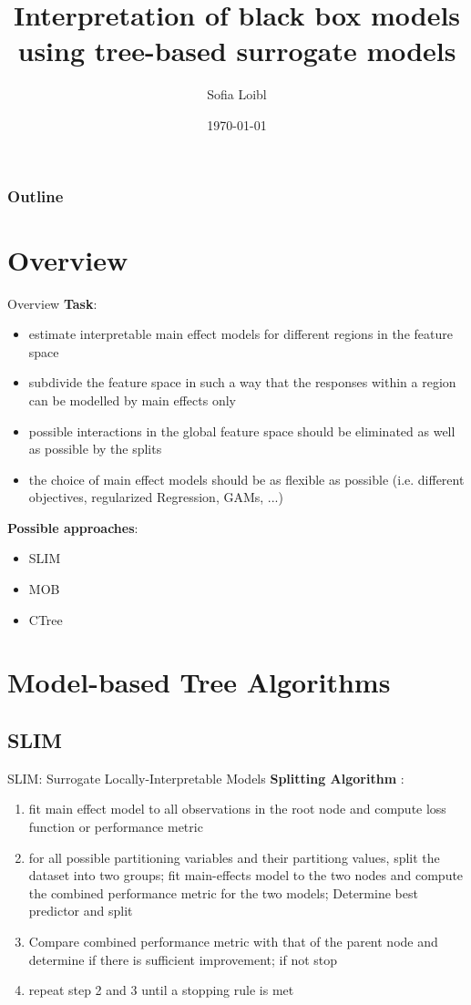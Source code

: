 \documentclass[9pt, xcolor=table]{beamer}
\title[Interpretation of black box models]{Interpretation of black box models using tree-based surrogate models}
\author[Sofia Loibl]{Sofia Loibl}
\institute[LMU]{LMU München}
\date{\today}
\begin{document}
\begin{frame}
\titlepage 
\end{frame}

\begin{frame}
\frametitle{Outline} 
\tableofcontents 
\end{frame}

\section{Overview}
\begin{frame}{Overview}
\textbf{Task}:
\begin{itemize}
    \item estimate interpretable main effect models for different regions in the feature space
    \item subdivide the feature space in such a way that the responses within a region can be modelled by main effects only
    \item possible interactions in the global feature space should be eliminated as well as possible by the splits
    \item the choice of main effect models should be as flexible as possible (i.e. different objectives, regularized Regression, GAMs, ...)
\end{itemize}
    
\vspace{0.5cm}

\textbf{Possible approaches}: 
\begin{itemize}
    \item SLIM
    \item MOB
    \item CTree
\end{itemize}
\end{frame}


\section{Model-based Tree Algorithms}
\subsection{SLIM}
\begin{frame}{SLIM: Surrogate Locally-Interpretable Models}
\textbf{Splitting Algorithm} \citep{Hu.2020}:
\begin{enumerate}
    \item fit main effect model to all observations in the root node and compute loss function or performance metric
    \item for all possible partitioning variables and their partitiong values, split the dataset into two groups; fit main-effects model to the two nodes and compute the combined performance metric for the two models; Determine best predictor and split
    \item Compare combined performance metric with that of the parent node and determine if there is sufficient improvement; if not stop
    \item repeat step 2 and 3 until a stopping rule is met
\end{enumerate}
    
\end{frame}
\end{document}
